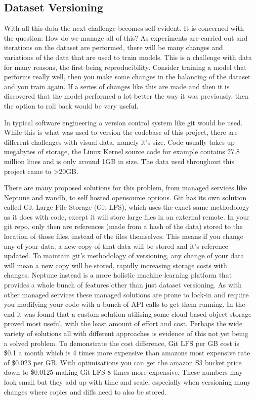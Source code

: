 \subsection{Dataset Versioning}
With all this data the next challenge becomes self evident. It is concerned with the question: How do we manage all of this?
As experiments are carried out and iterations on the dataset are performed, there will be many changes and variations of the data
that are used to train models.  This is a challenge with data for many reasons, the first being reproducibility.  Consider training a model
that performs really well, then you make some changes in the balancing of the dataset and you train again.  If a series of changes like this 
are made and then it is discovered that the model performed a lot better the way it was previously, then the option to roll back would be very useful.

In typical software engineering a version control system like git would be used.  While this is what was used to version the codebase of this project,
there are different challenges with visual data, namely it's size.  Code usually takes up megabytes of storage, the Linux Kernel source code for example contains
27.8 million lines and is only around 1GB in size.  The data used throughout this project came to >20GB.

There are many proposed solutions for this problem, from managed services like Neptune and wandb, to self hosted opensource options.  Git has its own
solution called Git Large File Storage (Git LFS), which uses the exact same methodology as it does with code, except it will store large files in an external 
remote.  In your git repo, only then are references (made from a hash of the data) stored to the location of those files, instead of the files themselves.  
This means if you change any of your data, a new copy 
of that data will be stored and it's reference updated.  To maintain git's methodology of versioning, any change of your data will mean a new copy 
will be stored, rapidly increasing storage costs with changes.  Neptune instead is a more holistic machine learning platform that provides a whole bunch of 
features other than just dataset versioning.  As with other managed services these managed solutions are prone to lock-in and require you modifying your code 
with a bunch of API calls to get them running.
In the end it was found that a custom solution utilising some cloud based object storage proved most useful, with the least amount of effort and cost.  
Perhaps the wide variety of solutions all with different approaches is evidence of this not yet being
a solved problem.  To demonstrate the cost difference, Git LFS per GB cost is \$0.1 a month which is 4 times more expensive
than amazons most expensive rate of \$0.023 per GB.  With optimisations you can get the amazon S3 bucket price down to \$0.0125 making Git LFS 8 times
more expensive.  These numbers may look small but they add up with time and scale, especially when versioning many changes where copies and diffs need
to also be stored.

